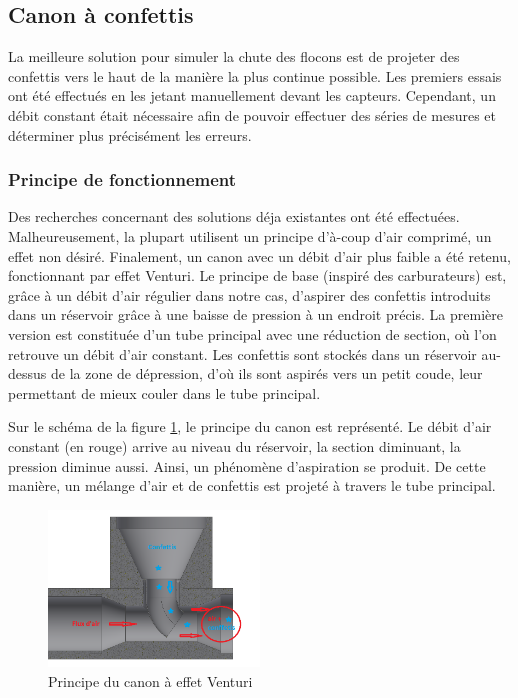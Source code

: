 \subsection{Canon à confettis}

La meilleure solution pour simuler la chute des flocons est de projeter des confettis vers le haut 
de la manière la plus continue possible. Les premiers essais ont été effectués en les jetant manuellement 
devant les capteurs. Cependant, un débit constant était nécessaire afin de pouvoir effectuer des séries de
mesures et déterminer plus précisément les erreurs. 

\subsubsection{Principe de fonctionnement}

Des recherches concernant des solutions déja existantes ont été effectuées. Malheureusement, la plupart 
utilisent un principe d'à-coup d'air comprimé, un effet non désiré. Finalement, un canon avec un 
débit d'air plus faible a été retenu, fonctionnant par effet Venturi.
Le principe de base (inspiré des carburateurs) est, grâce à un débit d’air régulier dans 
notre cas, d’aspirer des confettis introduits dans un réservoir grâce à une baisse de pression à un 
endroit précis. La première version est constituée d’un tube principal avec une réduction de section, où
l'on retrouve un débit d'air constant. Les confettis sont stockés dans un réservoir au-dessus de la zone 
de dépression, d'où ils sont aspirés vers un petit coude, leur permettant de mieux couler dans le 
tube principal.\par 
Sur le schéma de la figure \ref{fig:venturi}, le principe du canon est représenté. Le débit d’air constant 
(en rouge) arrive au niveau du réservoir, la section diminuant, la pression diminue aussi. Ainsi, un phénomène 
d’aspiration se produit. De cette manière, un mélange d'air et de confettis est projeté à travers le tube principal.

\begin{figure}[H]
    \centering
    \includegraphics[width=0.5\textwidth]{Images/photos_PGA/venturi_v1b.PNG}
    \caption{Principe du canon à effet Venturi}
    \label{fig:venturi}
\end{figure}

